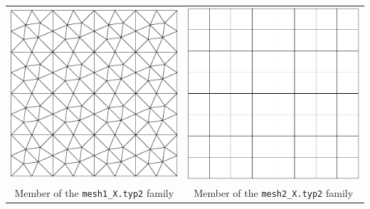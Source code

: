 \documentclass{article}
\begin{document}
\begin{center}
\begin{tabular}{cc}
\includegraphics[width=0.5\linewidth]{mesh1_2.pdf} & \includegraphics[width=0.5\linewidth]{mesh2_2.pdf} \\
{Member of the \texttt{mesh1\_X.typ2} family} & {Member of the \texttt{mesh2\_X.typ2} family}
\end{tabular}
\end{center}
\end{document}
